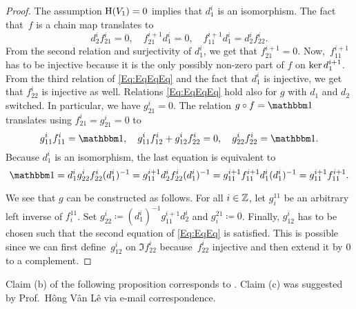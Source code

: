 \documentclass[\MainFolder/Text.tex]{subfiles}
\begin{document}
\begin{proof}
The assumption $\mathrm{H}(V_1)=0$ implies that $d^i_1$ is an isomorphism. The fact that~$f$ is a chain map translates to
\begin{equation}\label{Eq:EqEqEq}
d_2^i f^i_{21} = 0,\quad f^{i+1}_{21} d_1^i = 0,\quad f^{i+1}_{11} d^i_1 = d^i_2 f^i_{22}.
\end{equation}
From the second relation and surjectivity of $d_1^i$, we get that $f_{21}^{i+1} = 0$. Now,~$f^{i+1}_{11}$ has to be injective because it is the only possibly non-zero part of $f$ on $\operatorname{ker} d_1^{i+1}$. From the third relation of \eqref{Eq:EqEqEq} and the fact that $d_1^i$ is injective, we get that $f_{22}^i$ is injective as well.
Relations \eqref{Eq:EqEqEq} hold also for $g$ with $d_1$ and $d_2$ switched. In particular, we have $g_{21}^{i}=0$. The relation $g \circ f = \Id$ translates using $f^i_{21} = g^i_{21} = 0$ to
\begin{equation}\label{Eq:EqEq}
g^i_{11} f^i_{11} = \Id, \quad g^i_{11} f^i_{12} + g^i_{12}f^i_{22}=0, \quad g^i_{22} f^i_{22} = \Id.
\end{equation}
Because $d_1^i$ is an isomorphism, the last equation is equivalent to 
\[ \Id = d_1^i g^i_{22}f^i_{22} (d_1^i)^{-1} = g^{i+1}_{11} d_2^i f^i_{22} (d_1^i)^{-1} = g^{i+1}_{11} f^{i+1}_{11} d_1^i (d_1^i)^{-1} = g^{i+1}_{11} f^{i+1}_{11}. \]

We see that $g$ can be constructed as follows. For all $i\in \mathbb{Z}$, let $g_i^{11}$ be an arbitrary left inverse of $f_i^{11}$. Set $g_{22}^i \coloneqq (d_1^i)^{-1}g_{11}^{i+1} d_2^i$ and $g_i^{21}\coloneqq0$. Finally, $g_{12}^i$ has to be chosen such that the second equation of \eqref{Eq:EqEq} is satisfied. This is possible since we can first define~$g_{12}^i$ on $\Im f^i_{22}$ because~$f^i_{22}$ injective and then extend it by $0$ to a complement.
\end{proof}

Claim (b) of the following proposition corresponds to \cite[Lemma~2.8]{Van2019}. Claim (c) was suggested by Prof.~Hông Vân Lê via e-mail correspondence.
\end{document}

